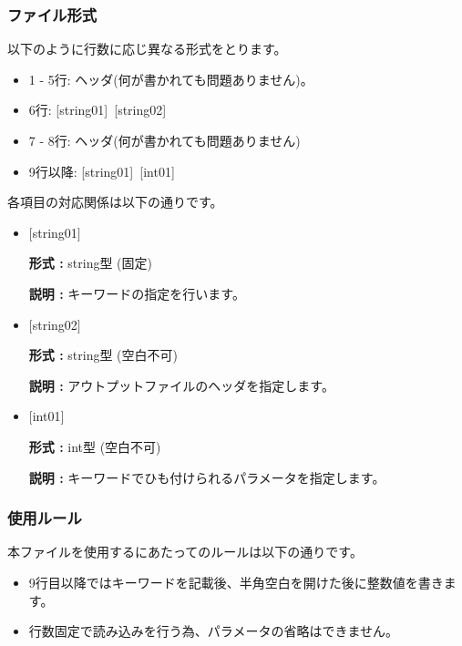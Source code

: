 \subsubsection{ファイル形式}
以下のように行数に応じ異なる形式をとります。
 \begin{itemize}
   \item  1 - 5行:  ヘッダ(何が書かれても問題ありません)。
   \item  6行:  [string01]~[string02]
   \item  7 - 8行: ヘッダ(何が書かれても問題ありません)
   \item  9行以降: [string01]~[int01]
  \end{itemize}
各項目の対応関係は以下の通りです。
\begin{itemize}
   \item  $[$string01$]$
   
   {\bf 形式 :} string型 (固定)

  {\bf 説明 :} キーワードの指定を行います。
   
   \item  $[$string02$]$
   
   {\bf 形式 :} string型 (空白不可)

  {\bf 説明 :} アウトプットファイルのヘッダを指定します。

   \item  $[$int01$]$
   
   {\bf 形式 :} int型 (空白不可)

  {\bf 説明 :} キーワードでひも付けられるパラメータを指定します。

  \end{itemize}

\subsubsection{使用ルール}
本ファイルを使用するにあたってのルールは以下の通りです。
\begin{itemize}
\item 9行目以降ではキーワードを記載後、半角空白を開けた後に整数値を書きます。
\item 行数固定で読み込みを行う為、パラメータの省略はできません。
\end{itemize}


